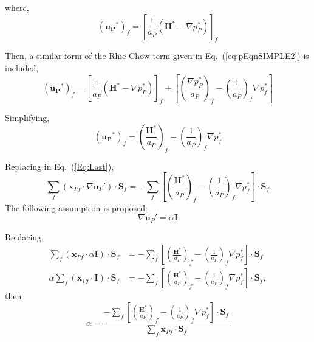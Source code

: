 \documentclass[final,3p,times,10pt,onecolumn]{myElsarticle}
\numberwithin{equation}{section}
\begin{document}
where,
\begin{equation}
\left(
\boldsymbol{u_P}^{*}
\right)_{f}
=
\left[\frac{1}{a_P}\left(\boldsymbol{H}^* - \nabla p_P^{*}\right)\right]_f
\end{equation}

Then, a similar form of the Rhie-Chow term given in Eq.~(\ref{eq:pEqnSIMPLE2}) is included,
\begin{equation}
\left(
\boldsymbol{u_P}^{*}
\right)_{f}
=
\left[\frac{1}{a_P}\left(\boldsymbol{H}^* - \nabla p_P^{*}\right)\right]_f
+
\left[
\left(
\frac{\nabla p_P^{*}}{a_P}
\right)_f
- 
\left(
\frac{1}{a_P}
\right)_f 
\nabla p_f^{*} 
\right]
\end{equation}

Simplifying, 
\begin{equation}
\left(
\boldsymbol{u_P}^{*}
\right)_{f}
=
 \left(\frac{\boldsymbol{H}^*}{a_P}\right)_f 
 -
 \left(\frac{1}{a_P}\right)_f \nabla p_f^{*}
\end{equation}

Replacing in Eq.~(\ref{Eq:Last}),
\begin{equation}
\sum_f 
\left(
\boldsymbol{x}_{Pf}
\cdot 
\nabla \boldsymbol{u}_P'
\right)
\cdot 
\boldsymbol{S}_f
=
-\sum_f
\left[
\left(\frac{\boldsymbol{H}^*}{a_P}\right)_f 
 -
 \left(\frac{1}{a_P}\right)_f \nabla p_f^{*}
 \right]
\cdot 
\boldsymbol{S}_f
\end{equation}
The following assumption is proposed:
\begin{equation}
\nabla \boldsymbol{u}_P'
=
\alpha
\boldsymbol{I}
\label{eq:gradApprox}
\end{equation}

Replacing,
\begin{align}
\sum_f 
\left(
\boldsymbol{x}_{Pf}
\cdot 
\alpha
\boldsymbol{I}
\right)
\cdot 
\boldsymbol{S}_f
&=
-\sum_f
\left[
\left(\frac{\boldsymbol{H}^*}{a_P}\right)_f 
 -
 \left(\frac{1}{a_P}\right)_f \nabla p_f^{*}
 \right]
\cdot 
\boldsymbol{S}_f
\\
\alpha
\sum_f 
\left(
\boldsymbol{x}_{Pf}
\cdot 
\boldsymbol{I}
\right)
\cdot 
\boldsymbol{S}_f
&=
-\sum_f
\left[
\left(\frac{\boldsymbol{H}^*}{a_P}\right)_f 
 -
 \left(\frac{1}{a_P}\right)_f \nabla p_f^{*}
 \right]
\cdot 
\boldsymbol{S}_f,
\end{align}
then
\begin{equation}
\alpha
=
\dfrac
{-\sum_f
\left[
\left(\frac{\boldsymbol{H}^*}{a_P}\right)_f 
 -
 \left(\frac{1}{a_P}\right)_f \nabla p_f^{*}
 \right]
\cdot 
\boldsymbol{S}_f}
{\sum_f 
\boldsymbol{x}_{Pf}
\cdot 
\boldsymbol{S}_f}
\end{equation}
\end{document}
